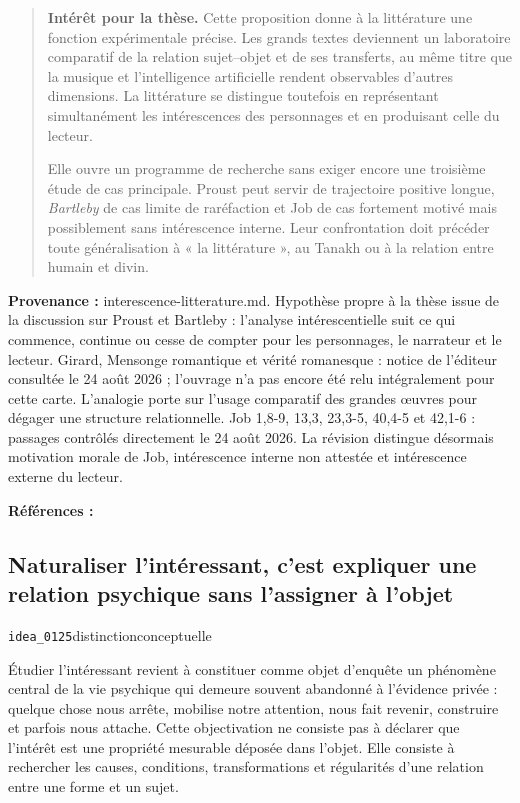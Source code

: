 \documentclass[10pt,a4paper]{article}
\begin{document}
\begin{quote}
\textbf{Intérêt pour la thèse.} Cette proposition donne à la littérature une fonction expérimentale précise. Les grands textes deviennent un laboratoire comparatif de la relation sujet–objet et de ses transferts, au même titre que la musique et l'intelligence artificielle rendent observables d'autres dimensions. La littérature se distingue toutefois en représentant simultanément les intérescences des personnages et en produisant celle du lecteur.

Elle ouvre un programme de recherche sans exiger encore une troisième étude de cas principale. Proust peut servir de trajectoire positive longue, \emph{Bartleby} de cas limite de raréfaction et Job de cas fortement motivé mais possiblement sans intérescence interne. Leur confrontation doit précéder toute généralisation à « la littérature », au Tanakh ou à la relation entre humain et divin.
\end{quote}
{\footnotesize\color{metadata}\textbf{Provenance :} interescence-litterature.md. Hypothèse propre à la thèse issue de la discussion sur Proust et Bartleby : l'analyse intérescentielle suit ce qui commence, continue ou cesse de compter pour les personnages, le narrateur et le lecteur. Girard, Mensonge romantique et vérité romanesque : notice de l'éditeur consultée le 24 août 2026 ; l'ouvrage n'a pas encore été relu intégralement pour cette carte. L'analogie porte sur l'usage comparatif des grandes œuvres pour dégager une structure relationnelle. Job 1,8-9, 13,3, 23,3-5, 40,4-5 et 42,1-6 : passages contrôlés directement le 24 août 2026. La révision distingue désormais motivation morale de Job, intérescence interne non attestée et intérescence externe du lecteur.\par}
{\footnotesize\color{metadata}\textbf{Références :} \parencite{girard1961mensonge,jps1985tanakh}\par}

\subsection{Naturaliser l'intéressant, c'est expliquer une relation psychique sans l'assigner à l'objet}
{\small\color{metadata} \texttt{idea\_0125}\quad\textbullet\quad distinction\quad\textbullet\quad conceptuelle\par}

Étudier l'intéressant revient à constituer comme objet d'enquête un phénomène central de la vie psychique qui demeure souvent abandonné à l'évidence privée : quelque chose nous arrête, mobilise notre attention, nous fait revenir, construire et parfois nous attache. Cette objectivation ne consiste pas à déclarer que l'intérêt est une propriété mesurable déposée dans l'objet. Elle consiste à rechercher les causes, conditions, transformations et régularités d'une relation entre une forme et un sujet.
\end{document}
